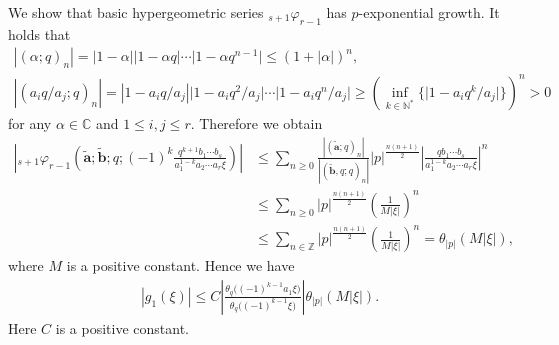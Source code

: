 \documentclass[11pt]{article}
\numberwithin{equation}{section}
\begin{document}
We show that basic hypergeometric series ${}_{s+1}\varphi_{r-1}$ has $p$-exponential growth. It holds that
\begin{gather*}
|(\alpha;q)_n| =|1-\alpha||1-\alpha q|\cdots\big|1-\alpha q^{n-1}\big|\le(1+|\alpha|)^n,\\
|(a_iq/a_j;q)_n| =|1-a_iq/a_j|\big|1-a_iq^2/a_j\big|\cdots\big|1-a_iq^n/a_j\big|\ge \left(\inf_{k\in\mathbb{N}^*}\big\{\big|1-a_iq^k/a_j\big|\big\}\right)^n>0
\end{gather*}
for any $\alpha\in\mathbb{C}$ and $1\le i,j\le r$. Therefore we obtain
\begin{align*}
\left|{}_{s+1}\varphi_{r-1}\left(\tilde{\bm{a}};\tilde{\bm{b}};q;(-1)^k\frac{q^{k+1}b_1\cdots b_s}{a_1^{1-k}a_2\cdots a_r\xi}\right)\right|&\le\sum_{n\ge0}\frac{|(\tilde{\bm{a}};q)_n|}{|(\tilde{\bm{b}},q;q)_n|}|p|^{\frac{n(n+1)}{2}}\left|\frac{qb_1\cdots b_s}{a_1^{1-k}a_2\cdots a_r\xi}\right|^n\\
&\le\sum_{n\ge0}|p|^{\frac{n(n+1)}{2}}\left(\frac{1}{M|\xi|}\right)^n\\
&\le\sum_{n\in\mathbb{Z}}|p|^{\frac{n(n+1)}{2}}\left(\frac{1}{M|\xi|}\right)^n=\theta_{|p|}(M|\xi|),
\end{align*}
where $M$ is a positive constant. Hence we have
\begin{gather}\label{g1_estimate_1}
|g_1(\xi)|\le C\left|\frac{\theta_q\big((-1)^{k-1}a_1\xi\big)}{\theta_q\big((-1)^{k-1}\xi\big)}\right|\theta_{|p|}(M|\xi|).
\end{gather}
Here $C$ is a positive constant.
\end{document}
